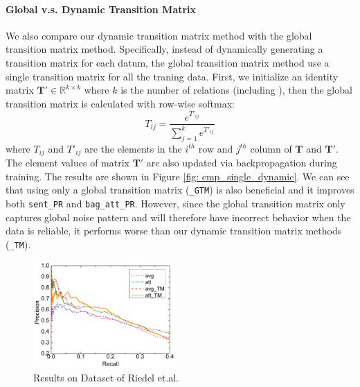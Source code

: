 \paragraph{Global v.s. Dynamic Transition Matrix}
We also compare our dynamic transition matrix method with the global transition matrix method.
Specifically, instead of dynamically generating a transition matrix for each datum, the global transition matrix method use a single transition matrix for all the traning data. First, we initialize an identity matrix $\mathbf{T}'\in\mathbb{R}^{k\times k}$ where $k$ is the number of relations (including ), then the global transition matrix is calculated with row-wise softmax:
\begin{equation}
\label{shared_mat}
T_{ij} = \frac{e^{T'_{ij}}}{\sum_{j=1}^{k}{e^{T'_{ij}}}}
\end{equation}
where $T_{ij}$ and $T'_{ij}$ are the elements in the $i^{th}$ row and $j^{th}$ column of $\mathbf{T}$ and $\mathbf{T}'$. The element values of matrix $\mathbf{T}'$ are also updated via backpropagation during training.
The results are shown in Figure \ref{fig: cmp_single_dynamic}.
We can see that using only a global transition matrix (\texttt{\_GTM}) is also beneficial and it improves both \texttt{sent\_PR} and \texttt{bag\_att\_PR}. However, since the global transition matrix only captures global noise pattern and will therefore have incorrect behavior when the data is reliable, it performs worse than our dynamic transition matrix methods (\texttt{\_TM}).

\begin{figure}[t!]
\includegraphics[width=0.48\textwidth]{figures/re_att_avg_cmp_exp.pdf}
\caption{Results on Dataset of Riedel et.al.}
\label{fig: Riedel_res}
\end{figure}

